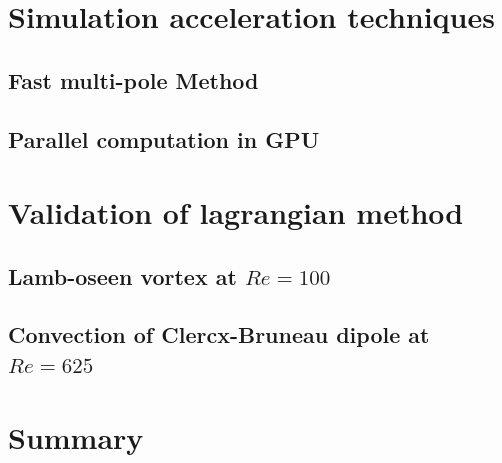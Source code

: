 \section{Simulation acceleration techniques}

\subsection{Fast multi-pole Method}

\subsection{Parallel computation in GPU}

\section{Validation of lagrangian method}

\subsection{Lamb-oseen vortex at $Re=100$}

\subsection{Convection of Clercx-Bruneau dipole at $Re=625$}

\section{Summary}



%
%
%
%
